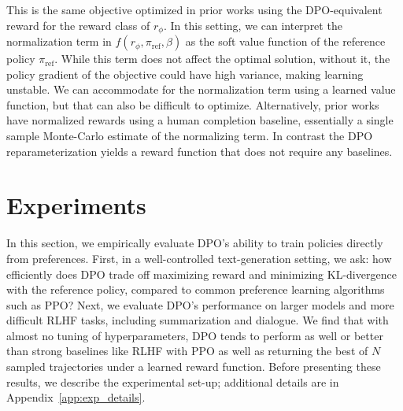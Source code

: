 This is the same objective optimized in prior works 
\citep{ziegler2020finetuning, stiennon2022learning, bai2022training, ouyang2022training} using the DPO-equivalent reward for the reward class of $r_{\phi}$. In this setting, we can interpret the normalization term in $f(r_{\phi}, \pi_\text{ref}, \beta)$ as the soft value function of the reference policy $\pi_\text{ref}$. While this term does not affect the optimal solution, without it, the policy gradient of the objective could have high variance, making learning unstable. We can accommodate for the normalization term using a learned value function, but that can also be difficult to optimize. Alternatively, prior works have normalized rewards using a human completion baseline, essentially a single sample Monte-Carlo estimate of the normalizing term. In contrast the DPO reparameterization yields a reward function that does not require any baselines. 

\section{Experiments}
In this section, we empirically evaluate DPO's ability to train policies directly from preferences. First, in a well-controlled text-generation setting, we ask: how efficiently does DPO trade off maximizing reward and minimizing KL-divergence with the reference policy, compared to common preference learning algorithms such as PPO? Next, we evaluate DPO's performance on larger models and more difficult RLHF tasks, including summarization and dialogue. We find that with almost no tuning of hyperparameters, DPO tends to perform as well or better than strong baselines like RLHF with PPO as well as returning the best of $N$ sampled trajectories under a learned reward function. Before presenting these results, we describe the experimental set-up; additional details are in Appendix~\ref{app:exp_details}.

